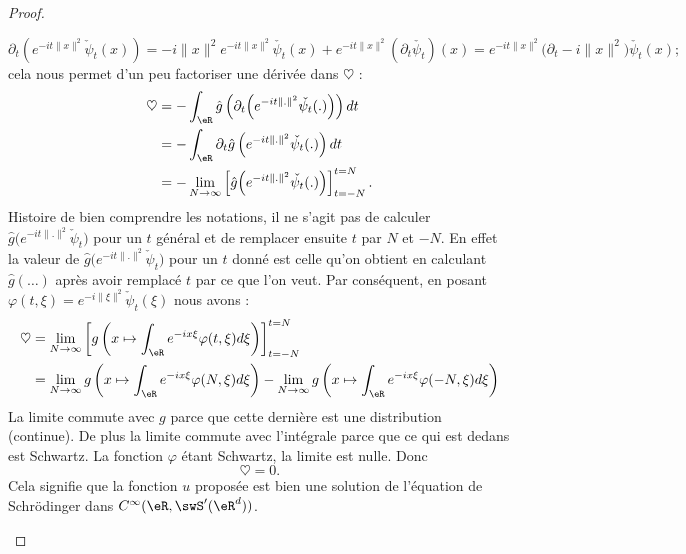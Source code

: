 \begin{proof}
\begin{subproof}
		\begin{equation}
			\partial_t\left(  e^{-it\| x \|^2}\check\psi_t(x) \right)=-i\| x \|^2 e^{-it\| x \|^2}\check{\psi_t}(x)+ e^{-it\| x \|^2}(\partial_t\check{\psi_t})(x)= e^{-it\| x \|^2}\big( \partial_t-i\| x \|^2 \big)\check{\psi_t}(x);
		\end{equation}
		cela nous permet d'un peu factoriser une dérivée dans \( \heartsuit\) :
		\begin{subequations}
			\begin{align}
				\heartsuit & =-\int_{\eR}\hat g\left( \partial_t\Big(  e^{-it\| . \|^2}\check{\psi_t}(.) \Big) \right)dt            \\
				           & =-\int_{\eR}\partial_t\hat g\left(  e^{-it\| . \|^2}\check{\psi_t}(.) \right)dt                        \\
				           & =-\lim_{N\to \infty} \left[ \hat g\Big(  e^{-it\| . \|^2}\check{\psi_t}(.) \Big) \right]_{t=-N}^{t=N}.
			\end{align}
		\end{subequations}
		Histoire de bien comprendre les notations, il ne s'agit pas de calculer \( \hat g\big(  e^{-it\| . \|^2}\check\psi_t \big)\) pour un \( t\) général et de remplacer ensuite \( t\) par \( N\) et \( -N\). En effet la valeur de \( \hat g\big(  e^{-it\| . \|^2}\check\psi_t \big)\) pour un \( t\) donné est celle qu'on obtient en calculant \( \hat g(\ldots)\) après avoir remplacé \( t\) par ce que l'on veut. Par conséquent, en posant \( \varphi(t,\xi)= e^{-i\| \xi \|^2}\check\psi_t(\xi)\) nous avons :
		\begin{subequations}
			\begin{align}
				\heartsuit & =\lim_{N\to \infty} \left[ g\left( x\mapsto\int_{\eR} e^{-ix\xi}\varphi(t,\xi )d\xi \right) \right]_{t=-N}^{t=N}                                                          \\
				           & =\lim_{N\to \infty} g\left( x\mapsto\int_{\eR} e^{-ix\xi}\varphi(N,\xi )d\xi \right)-\lim_{N\to \infty} g\left( x\mapsto\int_{\eR} e^{-ix\xi}\varphi(-N,\xi )d\xi \right)
			\end{align}
		\end{subequations}
		La limite commute avec \( g\) parce que cette dernière est une distribution (continue). De plus la limite commute avec l'intégrale parce que ce qui est dedans est Schwartz. La fonction \( \varphi\) étant Schwartz, la limite est nulle. Donc
		\begin{equation}
			\heartsuit=0.
		\end{equation}
		Cela signifie que la fonction \( u\) proposée est bien une solution de l'équation de Schrödinger dans \(  C^{\infty}(\eR,\swS'(\eR^d))\).


\end{subproof}
\end{proof}
